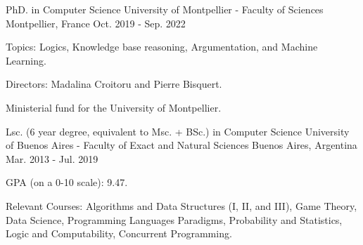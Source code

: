 

\begin{cventries}

  \cventry
    {PhD. in Computer Science}
    {University of Montpellier - Faculty of Sciences}
    {Montpellier, France}
    {Oct. 2019 - Sep. 2022}
    {
      \begin{cvitems}
        \item Topics: Logics, Knowledge base reasoning, Argumentation, and Machine Learning.
        \item Directors: Madalina Croitoru and Pierre Bisquert. 
        \item Ministerial fund for the University of Montpellier.
      \end{cvitems}
    }  

  \cventry
  {Lsc. (6 year degree, equivalent to Msc. + BSc.) in Computer Science}
  {University of Buenos Aires - Faculty of Exact and Natural Sciences}
  {Buenos Aires, Argentina}
  {Mar. 2013 - Jul. 2019}
  {
    \begin{cvitems}
      \item GPA (on a 0-10 scale): 9.47.
      \item Relevant Courses: Algorithms and Data Structures (I, II, and III), Game Theory, Data Science, Programming Languages Paradigms, Probability and Statistics, Logic and Computability, Concurrent Programming.
    \end{cvitems}
  }  

\end{cventries}
